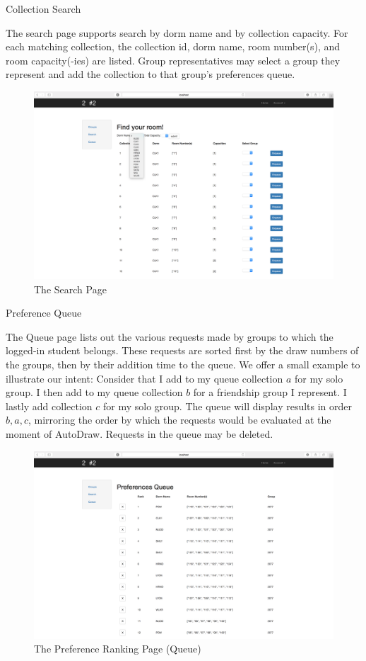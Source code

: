 \begin{outline}
\1 Collection Search

  \2 The search page supports search by dorm name and by collection capacity.
  For each matching collection, the collection id, dorm name, room number(s),
  and room capacity(-ies) are listed. Group representatives may select a group
  they represent and add the collection to that group's preferences queue.

\begin{figure}[H] \centering
\includegraphics[scale=.225]{screens/search}
\caption{The Search Page}
\label{fig:screensearch}
\end{figure}

\1 Preference Queue

  \2 The Queue page lists out the various requests made by groups to which the
  logged-in student belongs. These requests are sorted first by the draw numbers
  of the groups, then by their addition time to the queue. We offer a small
  example to illustrate our intent: Consider that I add to my queue collection
  \(a\) for my solo group. I then add to my queue collection \(b\) for a
  friendship group I represent. I lastly add collection \(c\) for my solo group.
  The queue will display results in order \(b, a, c\), mirroring the order by
  which the requests would be evaluated at the moment of AutoDraw.
  \2 Requests in the queue may be deleted.

\begin{figure}[H] \centering
\includegraphics[scale=.225]{screens/queue}
\caption{The Preference Ranking Page (Queue)}
\label{fig:screenqueue}
\end{figure}

\end{outline}
